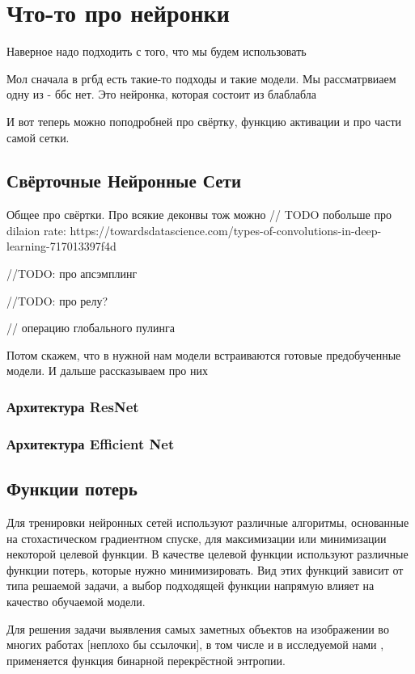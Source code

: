 \section{Что-то про нейронки}

Наверное надо подходить с того, что мы будем использовать 

Мол сначала в ргбд есть такие-то подходы и такие модели. Мы рассматрвиаем одну из - ббс нет. Это нейронка, которая состоит из блаблабла

И вот теперь можно поподробней про свёртку, функцию активации и про части самой сетки.


\subsection{Свёрточные Нейронные Сети}
Общее про свёртки.
Про всякие деконвы тож можно
// TODO побольше про dilaion rate: https://towardsdatascience.com/types-of-convolutions-in-deep-learning-717013397f4d


//TODO: про апсэмплинг

//TODO: про релу? 

// операцию глобального пулинга

Потом скажем, что в нужной нам модели встраиваются готовые предобученные модели. И дальше рассказываем про них
\subsubsection{Архитектура ResNet}
\subsubsection{Архитектура Efficient Net}

\subsection{Функции потерь}

Для тренировки нейронных сетей используют различные алгоритмы, основанные на стохастическом градиентном спуске,
для максимизации или минимизации некоторой целевой функции. В качестве целевой функции используют различные функции потерь, 
которые нужно минимизировать. Вид этих функций зависит от типа решаемой задачи, а выбор подходящей функции напрямую влияет на 
качество обучаемой модели. 

Для решения задачи выявления самых заметных объектов на изображении 
во многих работах [неплохо бы ссылочки], в том числе и в исследуемой нами \cite{BBS}, применяется функция бинарной перекрёстной энтропии.

